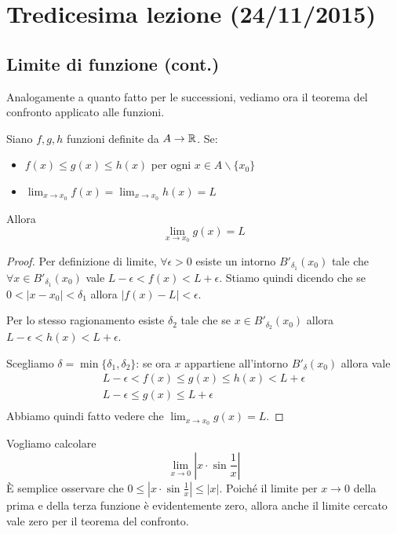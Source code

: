 \chapter{Tredicesima lezione (24/11/2015)}

\section{Limite di funzione (cont.)}

Analogamente a quanto fatto per le successioni, vediamo ora il teorema del confronto applicato alle funzioni.
\begin{theorem}
Siano $f, g, h$ funzioni definite da $A \to \mathbb R$. Se:
\begin{itemize}
\item $f(x) \le g(x) \le h(x)$ per ogni $x \in A \backslash\{x_0\}$
\item $\lim_{x \to x_0} f(x) = \lim_{x \to x_0} h(x) = L$
\end{itemize}
Allora 
\begin{equation*}
\lim_{x \to x_0} g(x) = L
\end{equation*}
\end{theorem}

\begin{proof}
Per definizione di limite, $\forall \epsilon > 0$ esiste un intorno $B'_{\delta_1} (x_0)$ tale che $\forall x \in B'_{\delta_1} (x_0)$ vale $L-\epsilon < f(x) < L + \epsilon$. Stiamo quindi dicendo che se $0 < |x - x_0| < \delta_1$ allora $|f(x)-L| < \epsilon$.

Per lo stesso ragionamento esiste $\delta_2$ tale che se $x \in B'_{\delta_2} (x_0)$ allora $L-\epsilon < h(x) < L + \epsilon$.

Scegliamo $\delta = \min\{\delta_1, \delta_2\}$: se ora $x$ appartiene all'intorno $B'_\delta (x_0)$ allora vale
\begin{gather*}
L-\epsilon < f(x) \le g(x) \le h(x) < L + \epsilon \\
L-\epsilon \le g(x) \le L + \epsilon \\
\end{gather*}
Abbiamo quindi fatto vedere che $\lim_{x \to x_0} g(x) = L$.
\end{proof}

\begin{example}
Vogliamo calcolare
\begin{equation*}
\lim_{x \to 0} \left\lvert x \cdot \sin \frac{1}{x} \right\rvert
\end{equation*}
È semplice osservare che $0 \le |x \cdot \sin \frac{1}{x}| \le |x|$. Poiché il limite per $x \to 0$ della prima e della terza funzione è evidentemente zero, allora anche il limite cercato vale zero per il teorema del confronto.
\end{example}

